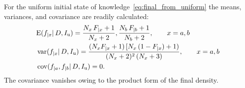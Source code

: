 \documentclass[\ifafour a4paper,12pt,\else a5paper,10pt,\fi%
onecolumn,oneside,article,%
british%
]{memoir}
\theoremstyle{remark}
\theoremstyle{innote}
\renewcommand*{\|}{\mathpunct{|}}
\newcommand*{\E}{\mathrm{E}}
\DeclarePairedDelimiter\expp{(}{)}
\newcommand*{\expe}{\E\expp}%
\DeclareMathOperator{\cov}{cov}
\DeclareMathOperator{\var}{var}
\newcommand*{\yD}{D}
\newcommand*{\yI}{I}
\newcommand*{\yIu}{\yI_\text{u}}
\newcommand*{\ya}{a}
\newcommand*{\yb}{b}
\begin{document}
For the uniform initial state of knowledge~\eqref{eq:final_from_uniform}
the means, variances, and covariance are readily calculated:
\begin{subequations}
  \label{eq:stats_final_unif}
  \begin{align}
    \label{eq:mean_final_unif}
    &\expe{f_{|x}\| \yD, \yIu} =
    \frac{N_{x}\,F_{|x}+1}{N_{x}+2},
    \frac{N_{\yb}\,F_{|\yb}+1}{N_{\yb}+2},
    \qquad x=\ya,\yb
    \\
    \label{eq:var_final_unif}
    &\var(f_{|x} \| \yD, \yIu) =
    \frac{(N_{x}F_{|x}+1)\,[N_{x}\,(1-F_{|x})+1)}{(N_{x}+2)^2\,(N_{x}+3)},
    \qquad x=\ya,\yb
    \\
    \label{eq:cov_final_unif}
    &\cov(f_{|\ya}, f_{|\yb} \| \yD, \yIu) = 0.
  \end{align}
\end{subequations}
The covariance vanishes owing to the product form of the final density.
\end{document}
